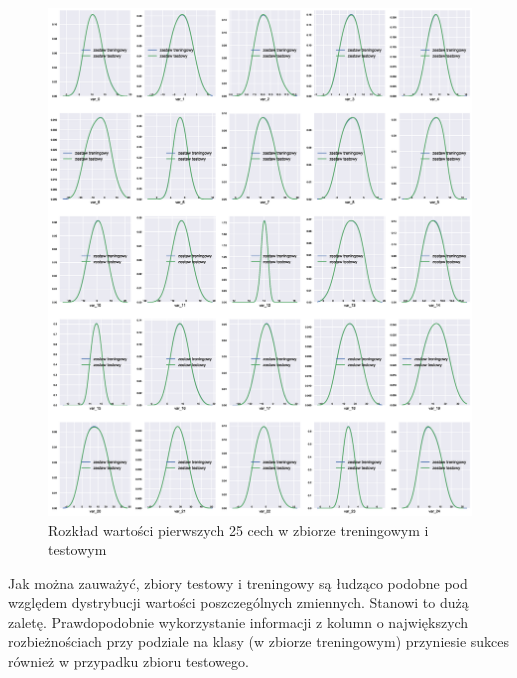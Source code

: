 ﻿\documentclass[12pt]{article}
\begin{document}
\begin{figure}[H]
\centering 
\includegraphics[width = 472pt]{feature_distribution_train_vs_test.eps}
\caption{Rozkład wartości pierwszych 25 cech w zbiorze treningowym i testowym}
\label{features_distribution_train_vs_test}
\end{figure}

Jak można zauważyć, zbiory testowy i treningowy są łudząco podobne pod względem dystrybucji wartości poszczególnych zmiennych. Stanowi to dużą zaletę. Prawdopodobnie wykorzystanie informacji z kolumn o największych rozbieżnościach przy podziale na klasy (w zbiorze treningowym) przyniesie sukces również w przypadku zbioru testowego.
\end{document}
